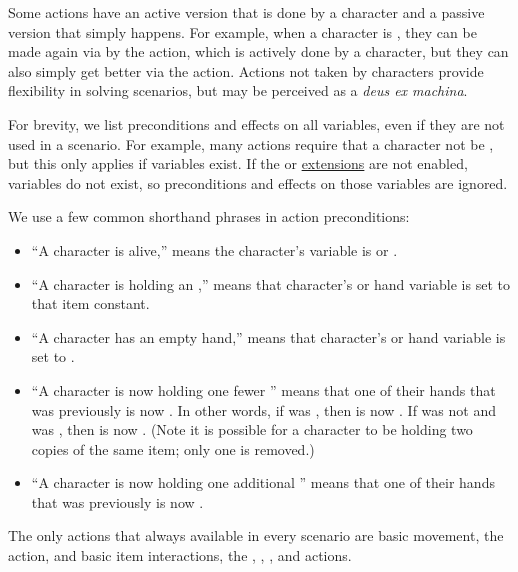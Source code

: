 \documentclass{nilreport}
\begin{document}
Some actions have an active version that is done by a character and a passive version that simply happens. For example, when a character is , they can be made  again via by the  action, which is actively done by a character, but they can also simply get better via the  action. Actions not taken by characters provide flexibility in solving scenarios, but may be perceived as a {\em deus ex machina}. 

For brevity, we list preconditions and effects on all variables, even if they are not used in a scenario. For example, many actions require that a character not be , but this only applies if  variables exist. If the  or  \hyperref[sec:extensions]{extensions} are not enabled,  variables do not exist, so preconditions and effects on those variables are ignored.

We use a few common shorthand phrases in action preconditions:
\begin{itemize}
	\item ``A character is alive,'' means the character's  variable is  or .
	\item ``A character is holding an ,'' means that character's  or  hand variable is set to that item constant.
	\item ``A character has an empty hand,'' means that character's  or  hand variable is set to \None.
	\item ``A character is now holding one fewer '' means that one of their hands that was previously  is now \None. In other words, if  was , then  is now \None. If  was not  and  was , then  is now \None. (Note it is possible for a character to be holding two copies of the same item; only one is removed.)
	\item ``A character is now holding one additional '' means that one of their hands that was previously \None is now .
\end{itemize}

The only actions that always available in every scenario are basic movement, the  action, and basic item interactions, the , , , and  actions.
\end{document}
